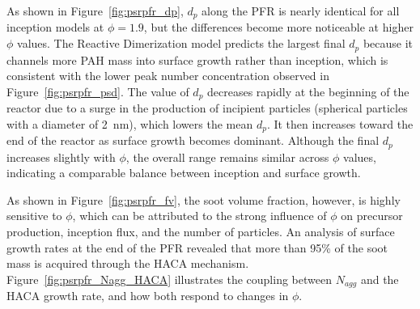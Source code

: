 
As shown in Figure~\ref{fig:psrpfr_dp}, $d_p$ along the PFR is nearly identical for all inception models at $\phi = 1.9$, but the differences become more noticeable at higher $\phi$ values. The Reactive Dimerization model predicts the largest final $d_p$ because it channels more PAH mass into surface growth rather than inception, which is consistent with the lower peak number concentration observed in Figure~\ref{fig:psrpfr_psd}. The value of $d_p$ decreases rapidly at the beginning of the reactor due to a surge in the production of incipient particles (spherical particles with a diameter of 2~nm), which lowers the mean $d_p$. It then increases toward the end of the reactor as surface growth becomes dominant. Although the final $d_p$ increases slightly with $\phi$, the overall range remains similar across $\phi$ values, indicating a comparable balance between inception and surface growth. 

As shown in Figure~\ref{fig:psrpfr_fv}, the soot volume fraction, however, is highly sensitive to $\phi$, which can be attributed to the strong influence of $\phi$ on precursor production, inception flux, and the number of particles. An analysis of surface growth rates at the end of the PFR revealed that more than 95\% of the soot mass is acquired through the HACA mechanism. Figure~\ref{fig:psrpfr_Nagg_HACA} illustrates the coupling between $N_{agg}$ and the HACA growth rate, and how both respond to changes in $\phi$.


